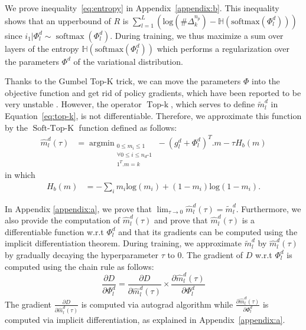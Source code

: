 \documentclass[11pt]{article}
\newcommand{\fyDone}[1]{\done[FY]\Todo[FY:]{\textcolor{orange}{#1}}}
\begin{document}
We prove inequality~\eqref{eq:entropy} in Appendix~\ref{appendix:b}.
This inequality shows that an upperbound of $R$ is $\sum_{l=1}^L(\text{log}(\#\Delta^{n_p}_k) - \mathbb{H}(\text{softmax}(\Phi_l^d)))$ since $i_1 | \Phi_l^d \sim \operatorname{softmax}(\Phi_l^d)$. During training, we thus maximize a sum over layers of the entropy $\mathbb{H}(\text{softmax}(\Phi_l^d))$\fyDone{Check sum} which performs a regularization over the parameters $\Phi^d$ of the variational distribution. 

Thanks to the Gumbel Top-K trick, we can move the parameters $\Phi$ into the objective function and get rid of policy gradients, which have been reported to be very unstable \citep{Diederick14auto}. However, the operator $\operatorname{Top-k}$, which serves to define $\tilde{m}_l^d$ in Equation~\eqref{eq:top-k}, is not differentiable. Therefore, we approximate this function by the $\operatorname{Soft-Top-K}$ function defined as follows:
\begin{align}
\hat{m}_l^d(\tau) &= \displaystyle{\mathop{argmin}_{\substack{
                    0 \leqslant m_i \leqslant 1 \\
  \forall 0 \leqslant i \leqslant n_d\text{-}1 \\
        1^{T}.m = k
      }}} -(g_l^d+\Phi_l^d)^{T} . m - \tau H_b(m) \label{eq:soft-top-k}
\end{align}
in which
\begin{align}
H_b(m) &= - \sum_i m_i \text{log}(m_i) + (1-m_i)\text{log}(1-m_i). \nonumber 
\end{align}

In Appendix \ref{appendix:a}, we prove that $\lim_{\tau \rightarrow 0}\hat{m}_l^d(\tau) = \tilde{m}_l^d$. Furthermore, we also provide the computation of $\hat{m}_l^d(\tau)$ and prove that $\hat{m}_l^d(\tau)$ is a differentiable function w.r.t $\Phi_l^d$ and that its gradients can be computed using the implicit differentiation theorem. During training, we approximate $\tilde{m}_l^d$ by $\hat{m}_l^d(\tau)$ by gradually decaying the hyperparameter $\tau$ to $0$. The gradient of $D$ w.r.t $\Phi_l^d$ is computed using the chain rule as follows:
\begin{equation}
\frac{\partial D}{\partial \Phi_l^d} = \frac{\partial D}{\partial \hat{m}_l^d(\tau)} \times \frac{\partial \hat{m}_l^d(\tau)}{\partial \Phi_l^d}
\end{equation}
The gradient $\frac{\partial D}{\partial \hat{m}_l^d(\tau)}$ is computed via autograd algorithm while $\frac{\partial \hat{m}_l^d(\tau)}{\partial \Phi_l^d}$ is computed via implicit differentiation, as explained in Appendix~\ref{appendix:a}.
\end{document}
